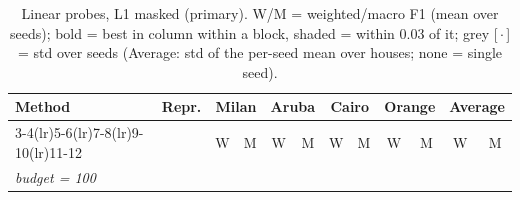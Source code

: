 \begin{table}[H]
\centering\small
\caption{Linear probes, L1 masked (primary). W/M = weighted/macro F1 (mean over seeds); bold = best in column within a block, shaded = within 0.03 of it; grey [\,$\cdot$\,] = std over seeds (Average: std of the per-seed mean over houses; none = single seed).}
\label{tab:probe_l1_masked}
\setlength{\tabcolsep}{3.2pt}
\begin{tabular}{llcc|cc|cc|cc|cc}
\toprule
Method & Repr. & \multicolumn{2}{c}{Milan} & \multicolumn{2}{c}{Aruba} & \multicolumn{2}{c}{Cairo} & \multicolumn{2}{c}{Orange} & \multicolumn{2}{c}{Average} \\
\cmidrule(lr){3-4}\cmidrule(lr){5-6}\cmidrule(lr){7-8}\cmidrule(lr){9-10}\cmidrule(lr){11-12}
 & & W & M & W & M & W & M & W & M & W & M \\
\midrule
\multicolumn{12}{l}{\textit{budget = 100}} \\
\midrule

\end{tabular}
\end{table}
